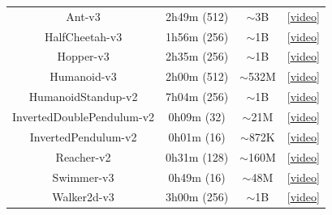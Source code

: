 \documentclass{article} %
\begin{document}
\begin{table}[H]
\begin{tabular}{|c|ccc|}
    Ant-v3 & 2h49m (512) & $\sim$3B & [\textcolor{blue}{\underline{\href{https://drive.google.com/file/d/1S6bF6xlUvQ78X6rizJfYdKcjlwHIDU2z/view}{video}}}]\\
    HalfCheetah-v3 & 1h56m (256) & $\sim$1B & [\textcolor{blue}{\underline{\href{https://drive.google.com/file/d/1IqYasTdzYX5iAdwRXFDY1yO_CNM-Rihk/view}{video}}}]\\
    Hopper-v3 & 2h35m (256) & $\sim$1B & [\textcolor{blue}{\underline{\href{https://drive.google.com/file/d/1WYOF5j2UZS4qhNo_rpqXwsbY4cq8S2MA/view}{video}}}]\\
    Humanoid-v3 & 2h00m (512) & $\sim$532M & [\textcolor{blue}{\underline{\href{https://drive.google.com/file/d/192NcLvpOLiXzqHOhJdaxsnGgeiPa_X6N/view}{video}}}]\\
    HumanoidStandup-v2 & 7h04m (256) & $\sim$1B & [\textcolor{blue}{\underline{\href{https://drive.google.com/file/d/1dsHZ3SveQiNHbHeyu4Jut25jTZuowM8a/view}{video}}}]\\
    InvertedDoublePendulum-v2 & 0h09m \hspace{0.15cm}(32) & $\sim$21M & [\textcolor{blue}{\underline{\href{https://drive.google.com/file/d/1AsGQq2kQq1_mlDhqmDo2k2zJXL0jkstN/view}{video}}}]\\
    InvertedPendulum-v2 & 0h01m \hspace{0.15cm}(16) & $\sim$872K & [\textcolor{blue}{\underline{\href{https://drive.google.com/file/d/15XMvygLxbhTnqGgu9ZuGdj5yx1DXQbF5/view}{video}}}]\\
    Reacher-v2 & 0h31m (128) & $\sim$160M & [\textcolor{blue}{\underline{\href{https://drive.google.com/file/d/1kzQHMLarPYZU2Whgqg8clhXe3G4agHa1/view}{video}}}]\\
    Swimmer-v3 & 0h49m \hspace{0.15cm}(16) & $\sim$48M & [\textcolor{blue}{\underline{\href{https://drive.google.com/file/d/1GEUNlRKI6f7YR_90GGh9qjY6-z4ZHuWf/view}{video}}}]\\
    Walker2d-v3 & 3h00m (256) & $\sim$1B & [\textcolor{blue}{\underline{\href{https://drive.google.com/file/d/1PjapO6V7l_0_rF4LI0FWKiTZd-jLmrBO/view}{video}}}]\\
  \hline
\end{tabular}
\label{table:table}
\end{table}



\end{document}
